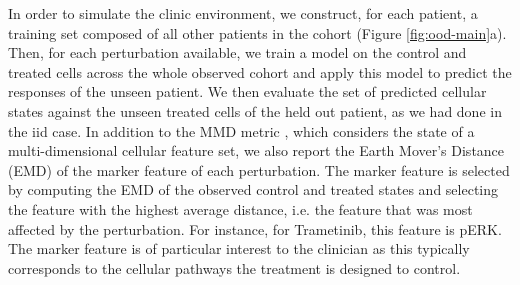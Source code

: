 In order to simulate the clinic environment, we construct, for each patient, a training set composed of all other patients in the cohort (Figure \ref{fig:ood-main}a).
Then, for each perturbation available,
we train a model on the control and treated cells across the whole observed cohort
and apply this model to predict the responses of the unseen patient.
We then evaluate the set of predicted cellular states against the unseen treated cells of the held out patient, as we had done in the iid case.
In addition to the MMD metric \cite{gretton2012}, which considers the state of a multi-dimensional cellular feature set,
we also report the Earth Mover’s Distance (EMD)\cite{villani2009} of the marker feature of each perturbation.
The marker feature is selected by computing the EMD of the observed control and treated states and selecting the feature with the highest average distance,
i.e. the feature that was most affected by the perturbation.
For instance, for Trametinib, this feature is pERK.
The marker feature is of particular interest to the clinician as this typically corresponds to the cellular pathways the treatment is designed to control.

